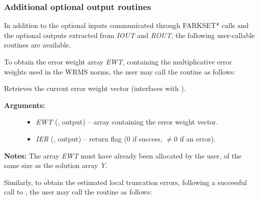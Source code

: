 \documentclass[letterpaper,10pt,english]{sphinxmanual}
\begin{document}
\subsubsection{Additional optional output routines}
\label{f_interface/Optional_output:additional-optional-output-routines}
In addition to the optional inputs communicated through FARKSET*
calls and the optional outputs extracted from \emph{IOUT} and \emph{ROUT},
the following user-callable routines are available.

To obtain the error weight array \emph{EWT}, containing the
multiplicative error weights used in the WRMS norms, the user may call
the routine {\hyperref[f_interface/Optional_output:f/_/FARKGETERRWEIGHTS]{}} as follows:

\begin{fulllineitems}
\label{f_interface/Optional_output:f/_/FARKGETERRWEIGHTS}
Retrieves the current error weight vector (interfaces
with {\hyperref[c_interface/User_callable:ARKodeGetErrWeights]{}}).
\begin{description}
\item[{\textbf{Arguments:}}] \leavevmode\begin{itemize}
\item {} 
\emph{EWT} (, output) -- array containing the error
weight vector.

\item {} 
\emph{IER}  (, output) -- return flag  (0 if success,
$\ne 0$ if an error).

\end{itemize}

\end{description}

\textbf{Notes:}
The array \emph{EWT} must have already been allocated by the user, of
the same size as the solution array \emph{Y}.

\end{fulllineitems}


Similarly, to obtain the estimated local truncation errors, following
a successful call to {\hyperref[f_interface/Usage:f/_/FARKODE]{}}, the user may call the
routine {\hyperref[f_interface/Optional_output:f/_/FARKGETESTLOCALERR]{}} as follows:
\end{document}
